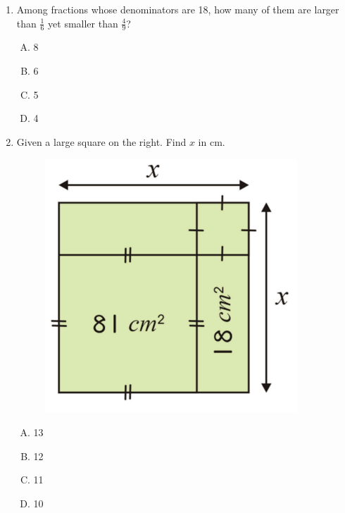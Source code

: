 \documentclass[12pt]{scrartcl}
\begin{document}
\begin{enumerate}[resume]
\newpage
\item Among fractions whose denominators are 18, how many of them are larger than $\frac{1}{6}$ yet smaller than $\frac{4}{9}$?
    \begin{multicols}{4}
        \begin{enumerate}[(A)]
            \item 8
            \item 6
            \item 5
            \item 4
        \end{enumerate}
    \end{multicols} \hrulefill

\item Given a large square on the right. Find $x$ in cm.
    \begin{figure}[h]
        \centering
        \includegraphics[scale=1]{StarGen/0Figure/wmi-2020-5a-square.png}
    \end{figure}
    \begin{multicols}{4}
        \begin{enumerate}[(A)]
            \item 13
            \item 12
            \item 11
            \item 10
        \end{enumerate}
    \end{multicols} \hrulefill


\end{enumerate}
\end{document}
